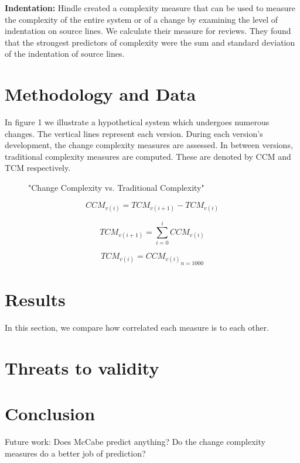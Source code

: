 \documentclass[8pt,twocolumn,a4paper]{article}
\begin{document}
{\bf Indentation:} Hindle \cite{Hindle2008ICPC} created a complexity
measure that can be used to measure the complexity of the entire system or of a
change by examining the level of indentation on source lines. We calculate
their measure for reviews. They found that the strongest predictors of
complexity were the sum and standard deviation of the indentation of source
lines. 


\section{Methodology and Data}


In figure 1 we illustrate a hypothetical system which undergoes numerous changes. The vertical lines represent each version. During each version's development, the change complexity measures are assessed. In between versions, traditional complexity measures are computed. These are denoted by CCM and TCM respectively.

\begin{figure}[h!]
  \centering
   \caption{"Change Complexity vs. Traditional Complexity"}
\end{figure}

\begin{equation}
{{CCM_{v(i)}} = {TCM_{v(i+1)}}-{TCM_{v(i)}}}
\end{equation}

\begin{equation}
{{TCM_{v(i+1)}} = \sum\limits_{i=0}^iCCM_{v(i)}}
\end{equation}
 
\begin{equation}
{{{TCM_{v(i)}} = CCM_{v(i)}}   _{n=1000}}
\end{equation}

\section{Results}

In this section, we compare how correlated each measure is to each other.

\section{Threats to validity}

\section{Conclusion}

Future work: Does McCabe predict anything? Do the change complexity measures do a better job of prediction?
\end{document}
